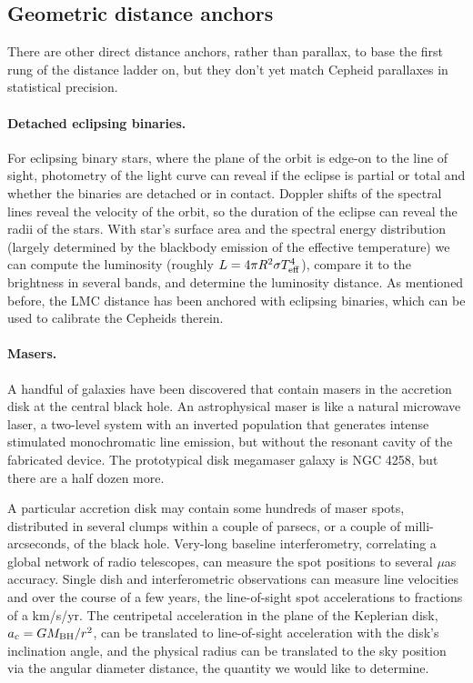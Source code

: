 \subsection{Geometric distance anchors}

There are other direct distance anchors, rather than parallax, to base the first rung of the distance ladder on, but they don't yet match Cepheid parallaxes in statistical precision.  

\paragraph{Detached eclipsing binaries.}  For eclipsing binary stars, where the plane of the orbit is edge-on to the line of sight, photometry of the light curve can reveal if the eclipse is partial or total and whether the binaries are detached or in contact.  Doppler shifts of the spectral lines reveal the velocity of the orbit, so the duration of the eclipse can reveal the radii of the stars.  With star's surface area and the spectral energy distribution (largely determined by the blackbody emission of the effective temperature) we can compute the luminosity (roughly $L = 4\pi R^2 \sigma T_{\rm eff}^4$), compare it to the brightness in several bands, and determine the luminosity distance.  As mentioned before, the LMC distance has been anchored with eclipsing binaries, which can be used to calibrate the Cepheids therein.

\paragraph{Masers.} A handful of galaxies have been discovered that contain masers in the accretion disk at the central black hole.  An astrophysical maser is like a natural microwave laser, a two-level system with an inverted population that generates intense stimulated  monochromatic line emission, but without the resonant cavity of the fabricated device.  The prototypical disk megamaser galaxy is NGC 4258, but there are a half dozen more.

A particular accretion disk may contain some hundreds of maser spots, distributed in several clumps within a couple of parsecs, or a couple of milli-arcseconds, of the black hole.  Very-long baseline interferometry, correlating a global network of radio telescopes, can measure the spot positions to several $\mu$as accuracy.   Single dish and interferometric observations can measure line velocities and over the course of a few years, the line-of-sight spot accelerations to fractions of a km/s/yr.  The centripetal acceleration in the plane of the Keplerian disk, $a_c = G M_{\rm BH}/r^2 $, can be translated to line-of-sight acceleration with the disk's inclination angle, and the physical radius can be translated to the sky position via the angular diameter distance, the quantity we would like to determine.

